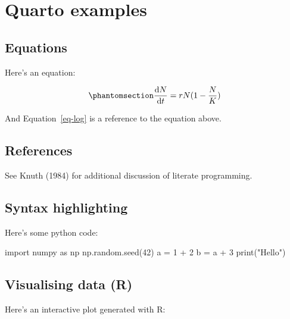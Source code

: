 \documentclass[
  letterpaper,
  DIV=11,
  numbers=noendperiod]{scrreprt}
\newenvironment{Shaded}{\begin{snugshade}}{\end{snugshade}}
\newcommand{\BuiltInTok}[1]{\textcolor[rgb]{0.00,0.23,0.31}{#1}}
\newcommand{\DecValTok}[1]{\textcolor[rgb]{0.68,0.00,0.00}{#1}}
\newcommand{\ImportTok}[1]{\textcolor[rgb]{0.00,0.46,0.62}{#1}}
\newcommand{\NormalTok}[1]{\textcolor[rgb]{0.00,0.23,0.31}{#1}}
\newcommand{\OperatorTok}[1]{\textcolor[rgb]{0.37,0.37,0.37}{#1}}
\newcommand{\StringTok}[1]{\textcolor[rgb]{0.13,0.47,0.30}{#1}}
\theoremstyle{definition}
\theoremstyle{remark}
\begin{document}
\cleardoublepage
{}
{}
\appendix

\chapter{Quarto examples}\label{quarto-examples}

\section{Equations}\label{equations-1}

Here's an equation:

\begin{equation}\phantomsection\label{eq-log}{ 
\frac{\mathrm{d}N}{\mathrm{d}t} = rN(1 - \frac{N}{K}) 
}\end{equation}

And Equation~\ref{eq-log} is a reference to the equation above.

\section{References}\label{references-2}

See Knuth (1984) for additional discussion of literate programming.

\section{Syntax highlighting}\label{syntax-highlighting-1}

Here's some python code:

\begin{Shaded}
\begin{Highlighting}[]
\ImportTok{import}\NormalTok{ numpy }\ImportTok{as}\NormalTok{ np}
\NormalTok{np.random.seed(}\DecValTok{42}\NormalTok{)}
\NormalTok{a }\OperatorTok{=} \DecValTok{1} \OperatorTok{+} \DecValTok{2}
\NormalTok{b }\OperatorTok{=}\NormalTok{ a }\OperatorTok{+} \DecValTok{3}
\BuiltInTok{print}\NormalTok{(}\StringTok{"Hello"}\NormalTok{)}
\end{Highlighting}
\end{Shaded}

\section{Visualising data (R)}\label{visualising-data-r-1}

Here's an interactive plot generated with R:
\end{document}
